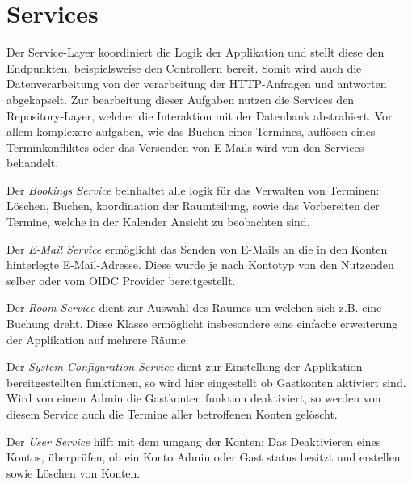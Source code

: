 
\chapter{Services}
\label{ch:services}


Der Service-Layer koordiniert die Logik der Applikation und stellt diese den Endpunkten, beispielsweise den Controllern bereit.
Somit wird auch die Datenverarbeitung von der verarbeitung der HTTP-Anfragen und antworten abgekapselt.
Zur bearbeitung dieser Aufgaben nutzen die Services den Repository-Layer, welcher die Interaktion mit der Datenbank abstrahiert.
Vor allem komplexere aufgaben, wie das Buchen eines Termines, auflösen eines Terminkonfliktes oder das
Versenden von E-Mails wird von den Services behandelt.

Der \textit{Bookings Service} beinhaltet alle logik für das Verwalten von Terminen: Löschen, Buchen, koordination der Raumteilung, sowie das Vorbereiten der Termine, welche in der Kalender Ansicht zu beobachten sind.

Der \textit{E-Mail Service} ermöglicht das Senden von E-Mails an die in den Konten hinterlegte E-Mail-Adresse.
Diese wurde je nach Kontotyp von den Nutzenden selber oder vom \gls{OIDC} Provider bereitgestellt.

Der \textit{Room Service} dient zur Auswahl des Raumes um welchen sich z.B. eine Buchung dreht.
Diese Klasse ermöglicht insbesondere eine einfache erweiterung der Applikation auf mehrere Räume.

Der \textit{System Configuration Service} dient zur Einstellung der Applikation bereitgestellten funktionen, so wird hier eingestellt ob Gastkonten aktiviert sind.
Wird von einem Admin die Gastkonten funktion deaktiviert, so werden von diesem Service auch die Termine aller betroffenen Konten gelöscht.

Der \textit{User Service} hilft mit dem umgang der Konten: Das Deaktivieren eines Kontos, überprüfen, ob ein Konto Admin oder Gast status besitzt und erstellen sowie Löschen von Konten.


